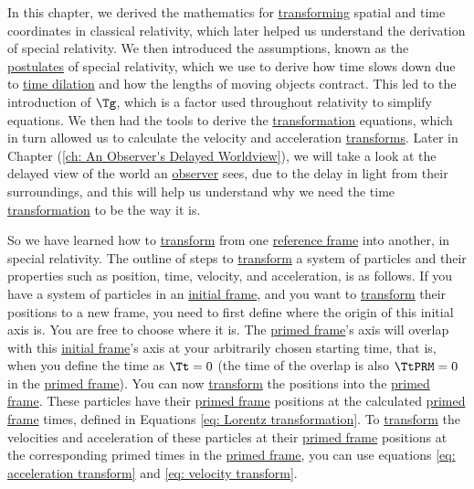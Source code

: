 In this chapter, we derived the mathematics for \hyperlink{def-transform}{transforming} spatial and time coordinates in classical relativity, which later helped us understand the derivation of special relativity.
We then introduced the assumptions, known as the \hyperlink{def-postulates}{postulates} of special relativity, which we use to derive how time slows down due to \hyperlink{def-time-dilation}{time dilation} and how the lengths of moving objects contract.
This led to the introduction of $\Tg $, which is a factor used throughout relativity to simplify equations.
We then had the tools to derive the \hyperlink{def-transform}{transformation} equations, which in turn allowed us to calculate the velocity and acceleration \hyperlink{def-transform}{transforms}.
Later in Chapter (\ref{ch: An Observer's Delayed Worldview}), we will take a look at the delayed view of the world an \hyperlink{def-observer}{observer} sees, due to the delay in light from their surroundings, and this will help us understand why we need the time \hyperlink{def-transform}{transformation} to be the way it is.

So we have learned how to \hyperlink{def-transform}{transform} from one \hyperlink{def-Reference-frame}{reference frame} into another, in special relativity.
The outline of steps to \hyperlink{def-transform}{transform} a system of particles and their properties such as position, time, velocity, and acceleration, is as follows.
If you have a system of particles in an \hyperlink{def-initial-Frame}{initial frame}, and you want to \hyperlink{def-transform}{transform} their positions to a new frame, you need to first define where the origin of this initial axis is.
You are free to choose where it is.
The \hyperlink{def-Primed-Frame}{primed frame}'s axis will overlap with this \hyperlink{def-initial-Frame}{initial frame}'s axis at your arbitrarily chosen starting time, that is, when you define the time as ${\Tt }=0$ (the time of the overlap is also $\TtPRM =0$ in the \hyperlink{def-Primed-Frame}{primed frame}).
You can now \hyperlink{def-transform}{transform} the positions into the \hyperlink{def-Primed-Frame}{primed frame}.
These particles have their \hyperlink{def-Primed-Frame}{primed frame} positions at the calculated \hyperlink{def-Primed-Frame}{primed frame} times, defined in Equations \eqref{eq: Lorentz transformation}.
To \hyperlink{def-transform}{transform} the velocities and acceleration of these particles at their \hyperlink{def-Primed-Frame}{primed frame} positions at the corresponding primed times in the \hyperlink{def-Primed-Frame}{primed frame}, you can use equations \eqref{eq: acceleration transform} and \eqref{eq: velocity transform}.

